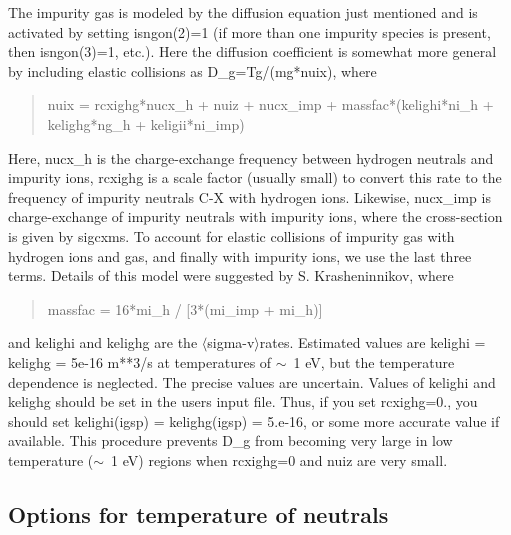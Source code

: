 \documentclass [12pt]{article}
\def\tild{$\sim$}
\def\la{$\langle$}
\def\ra{$\rangle$}
\begin{document}
The impurity gas is modeled by the diffusion equation just mentioned and is
activated by setting {\sf isngon(2)=1} (if more than one impurity species is
present, then {\sf isngon(3)=1}, etc.).  Here the diffusion coefficient is
somewhat more general by including elastic collisions as D\_g=Tg/(mg*nuix),
where
\begin{verse} \sf
     nuix = rcxighg*nucx\_h + nuiz + nucx\_imp + massfac*(kelighi*ni\_h + 
             kelighg*ng\_h + keligii*ni\_imp)
\end{verse}
Here, {\sf nucx\_h} is the charge-exchange frequency between hydrogen neutrals
and impurity ions, rcxighg is a scale factor (usually small) to convert this
rate to the frequency of impurity neutrals C-X with hydrogen ions.  Likewise,
{\sf nucx\_imp} is charge-exchange of impurity neutrals with impurity ions,
where the cross-section is given by {\sf sigcxms}. To account for elastic
collisions of impurity gas with hydrogen ions and gas, and finally with
impurity ions, we use the last three terms.  Details of this model were
suggested by S.  Krasheninnikov, where
\begin{verse} \sf
                       massfac = 16*mi\_h / [3*(mi\_imp + mi\_h)]
\end{verse}
and {\sf kelighi} and {\sf kelighg} are the \la sigma-v\ra rates.  Estimated
values are {\sf kelighi = kelighg} = 5e-16 m**3/s at temperatures of \tild~1
eV, but the temperature dependence is neglected. The precise values are
uncertain.  Values of {\sf kelighi} and {\sf kelighg} should be set in the
users input file.  Thus, if you set {\sf rcxighg=0.}, you should set {\sf
kelighi(igsp) = kelighg(igsp)} = 5.e-16, or some more accurate value if
available.  This procedure prevents D\_g from becoming very large in low
temperature (\tild~1 eV) regions when {\sf rcxighg=0} and {\sf nuiz} are very
small.

\subsection{Options for temperature of neutrals}
\end{document}
